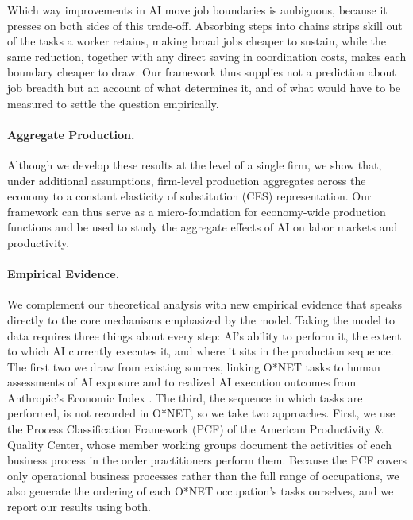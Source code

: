 Which way improvements in AI move job boundaries is ambiguous, because it presses on both sides of this trade-off.
Absorbing steps into chains strips skill out of the tasks a worker retains, making broad jobs cheaper to sustain, while the same reduction, together with any direct saving in coordination costs, makes each boundary cheaper to draw.
Our framework thus supplies not a prediction about job breadth but an account of what determines it, and of what would have to be measured to settle the question empirically.

\paragraph{Aggregate Production.}
Although we develop these results at the level of a single firm, we show that, under additional assumptions, firm-level production aggregates across the economy to a constant elasticity of substitution (CES) representation.
Our framework can thus serve as a micro-foundation for economy-wide production functions and be used to study the aggregate effects of AI on labor markets and productivity.


\paragraph{Empirical Evidence.}
We complement our theoretical analysis with new empirical evidence that speaks directly to the core mechanisms emphasized by the model.
Taking the model to data requires three things about every step: AI's ability to perform it, the extent to which AI currently executes it, and where it sits in the production sequence.
The first two we draw from existing sources, linking O*NET tasks to human assessments of AI exposure \citep{eloundou2023gpts} and to realized AI execution outcomes from Anthropic's Economic Index \citep{handa2025economictasksperformedai}.
The third, the sequence in which tasks are performed, is not recorded in O*NET, so we take two approaches.
First, we use the Process Classification Framework (PCF) of the American Productivity \& Quality Center, whose member working groups document the activities of each business process in the order practitioners perform them.
Because the PCF covers only operational business processes rather than the full range of occupations, we also generate the ordering of each O*NET occupation's tasks ourselves, and we report our results using both.

